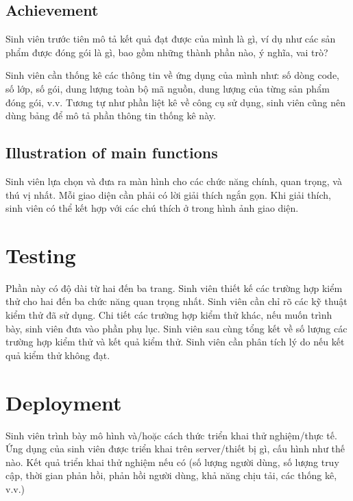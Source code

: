 \documentclass[../main.tex]{subfiles}
\begin{document}
\subsection{Achievement}
Sinh viên trước tiên mô tả kết quả đạt được của mình là gì, ví dụ như các sản phẩm được đóng gói là gì, bao gồm những thành phần nào, ý nghĩa, vai trò?

Sinh viên cần thống kê các thông tin về ứng dụng của mình như: số dòng code, số lớp, số gói, dung lượng toàn bộ mã nguồn, dung lượng của từng sản phẩm đóng gói, v.v. Tương tự như phần liệt kê về công cụ sử dụng, sinh viên cũng nên dùng bảng để mô tả phần thông tin thống kê này.

\subsection{Illustration of main functions}
Sinh viên lựa chọn và đưa ra màn hình cho các chức năng chính, quan trọng, và thú vị nhất. Mỗi giao diện cần phải có lời giải thích ngắn gọn. Khi giải thích, sinh viên có thể kết hợp với các chú thích ở trong hình ảnh giao diện.

\section{Testing}
Phần này có độ dài từ hai đến ba trang. Sinh viên thiết kế các trường hợp kiểm thử cho hai đến ba chức năng quan trọng nhất. Sinh viên cần chỉ rõ các kỹ thuật kiểm thử đã sử dụng. Chi tiết các trường hợp kiểm thử khác, nếu muốn trình bày, sinh viên đưa vào phần phụ lục.
Sinh viên sau cùng tổng kết về số lượng các trường hợp kiểm thử và kết quả kiểm thử. Sinh viên cần phân tích lý do nếu kết quả kiểm thử không đạt.
\section{Deployment}
Sinh viên trình bày mô hình và/hoặc cách thức triển khai thử nghiệm/thực tế. Ứng dụng của sinh viên được triển khai trên server/thiết bị gì, cấu hình như thế nào. Kết quả triển khai thử nghiệm nếu có (số lượng người dùng, số lượng truy cập, thời gian phản hồi, phản hồi người dùng, khả năng chịu tải, các thống kê, v.v.)
\end{document}
